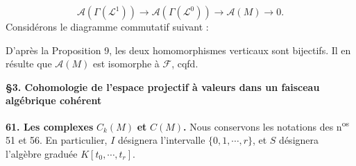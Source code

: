 \begin{equation*}
\mathcal{A}(\Gamma(\mathcal{L}^1)) \to \mathcal{A}(\Gamma(\mathcal{L}^0)) \to \mathcal{A}(M) \to 0.
\end{equation*}
Considérons le diagramme commutatif suivant :

\begin{center}
\end{center}
D'après la Proposition 9, les deux homomorphismes verticaux sont bijectifs. Il en résulte que $\mathcal{A}(M)$ est isomorphe à $\mathcal{F}$, cqfd.


\textbf{§3. Cohomologie de l'espace projectif à valeurs dans un faisceau algébrique cohérent}

\textbf{61. Les complexes} $C_k(M)$ \textbf{et} $C(M)$\textbf{.} Nous conservons les notations des n\textsuperscript{os} 51 et 56. En particulier, $I$ désignera l'intervalle $\{0, 1, \cdots , r\}$, et $S$ désignera l'algèbre graduée $K[t_0 , \cdots , t_r]$.

